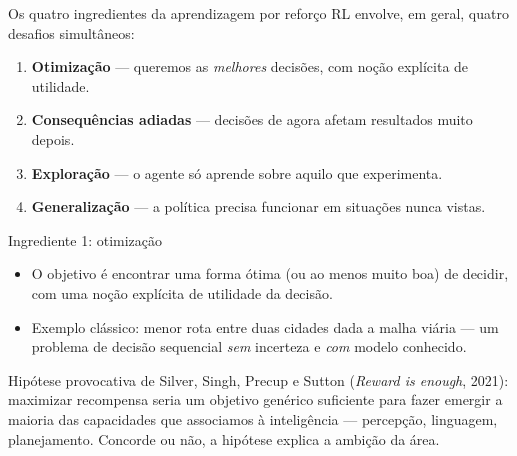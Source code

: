 \documentclass[aspectratio=169, 11pt]{beamer}
\begin{document}
\begin{frame}{Os quatro ingredientes da aprendizagem por reforço}
  RL envolve, em geral, quatro desafios simultâneos:

  \medskip
  \begin{enumerate}
    \item<1-> \textbf{Otimização} — queremos as \emph{melhores} decisões,
          com noção explícita de utilidade.
    \item<2-> \textbf{Consequências adiadas} — decisões de agora afetam
          resultados muito depois.
    \item<3-> \textbf{Exploração} — o agente só aprende sobre aquilo que
          experimenta.
    \item<4-> \textbf{Generalização} — a política precisa funcionar em
          situações nunca vistas.
  \end{enumerate}

  \medskip
\end{frame}

\begin{frame}{Ingrediente 1: otimização}
  \begin{itemize}
    \item O objetivo é encontrar uma forma \alert{ótima} (ou ao menos muito
          boa) de decidir, com uma noção explícita de utilidade da decisão.
    \item Exemplo clássico: menor rota entre duas cidades dada a malha
          viária — um problema de decisão sequencial \emph{sem} incerteza
          e \emph{com} modelo conhecido.
  \end{itemize}

  \begin{ideiabox}
    Hipótese provocativa de Silver, Singh, Precup e Sutton (\emph{Reward is
    enough}, 2021): maximizar recompensa seria um objetivo genérico
    suficiente para fazer emergir a maioria das capacidades que associamos
    à inteligência — percepção, linguagem, planejamento. Concorde ou não,
    a hipótese explica a ambição da área.
  \end{ideiabox}
\end{frame}
\end{document}
